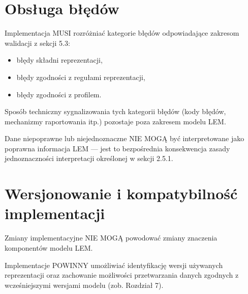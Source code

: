 \section{Obsługa błędów}
Implementacja MUSI rozróżniać kategorie błędów odpowiadające zakresom walidacji z sekcji 5.3:

\begin{itemize}
    \item błędy składni reprezentacji,
    \item błędy zgodności z regułami reprezentacji,
    \item błędy zgodności z profilem.
\end{itemize}

Sposób techniczny sygnalizowania tych kategorii błędów (kody błędów, mechanizmy raportowania itp.) pozostaje poza zakresem modelu LEM.

Dane niepoprawne lub niejednoznaczne NIE MOGĄ być interpretowane jako poprawna informacja LEM — jest to bezpośrednia konsekwencja zasady jednoznaczności interpretacji określonej w sekcji 2.5.1.

\section{Wersjonowanie i kompatybilność implementacji}
Zmiany implementacyjne NIE MOGĄ powodować zmiany znaczenia komponentów modelu LEM.

Implementacje POWINNY umożliwiać identyfikację wersji używanych reprezentacji oraz zachowanie możliwości przetwarzania danych zgodnych z wcześniejszymi wersjami modelu (zob. Rozdział 7).